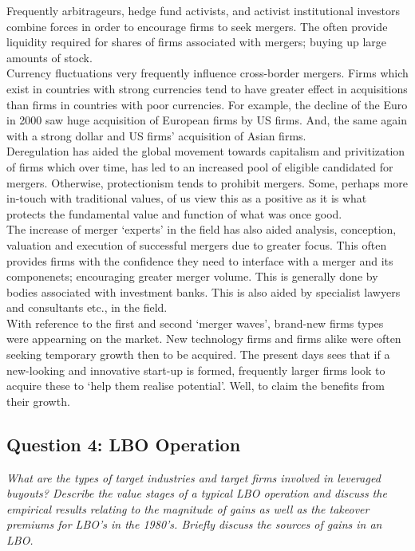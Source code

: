 \documentclass[11pt, english]{article}
\begin{document}
        Frequently arbitrageurs, hedge fund activists, and activist institutional investors combine forces in order to encourage firms to seek mergers. The often provide liquidity required for shares of firms associated with mergers; buying up large amounts of stock.\\

        Currency fluctuations very frequently influence cross-border mergers. Firms which exist in countries with strong currencies tend to have greater effect in acquisitions than firms in countries with poor currencies. For example, the decline of the Euro in 2000 saw huge acquisition of European firms by US firms. And, the same again with a strong dollar and US firms' acquisition of Asian firms.\\

        Deregulation has aided the global movement towards capitalism and privitization of firms which over time, has led to an increased pool of eligible candidated for mergers. Otherwise, protectionism tends to prohibit mergers. Some, perhaps more in-touch with traditional values, of us view this as a positive as it is what protects the fundamental value and function of what was once good.\\

        The increase of merger `experts' in the field has also aided analysis, conception, valuation and execution of successful mergers due to greater focus. This often provides firms with the confidence they need to interface with a merger and its componenets; encouraging greater merger volume. This is generally done by bodies associated with investment banks. This is also aided by specialist lawyers and consultants etc., in the field.\\

        With reference to the first and second `merger waves', brand-new firms types were appearning on the market. New technology firms and firms alike were often seeking temporary growth then to be acquired. The present days sees that if a new-looking and innovative start-up is formed, frequently larger firms look to acquire these to `help them realise potential'. Well, to claim the benefits from their growth.

	\newpage

	\subsection{Question 4: LBO Operation}

	\textit{What are the types of target industries and target firms involved in leveraged buyouts? Describe the value stages of a typical LBO operation and discuss the empirical results relating to the magnitude of gains as well as the takeover premiums for LBO's in the 1980's. Briefly discuss the sources of gains in an LBO.}\\
\end{document}
